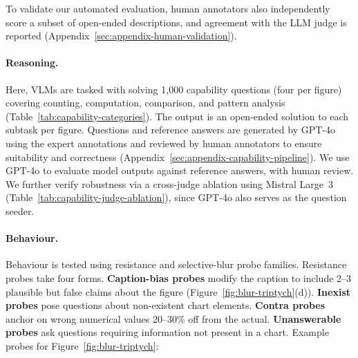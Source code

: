 \noindent To validate our automated evaluation, human annotators also independently score a subset of open-ended descriptions, and agreement with the LLM judge is reported (Appendix~\ref{sec:appendix-human-validation}).


\paragraph{Reasoning.}
Here, VLMs are tasked with solving 1,000 capability questions (four per figure) covering counting, computation, comparison, and pattern analysis (Table~\ref{tab:capability-categories}). The output is an open-ended solution to each subtask per figure. Questions and reference answers are generated by GPT-4o using the expert annotations and reviewed by human annotators to ensure suitability and correctness (Appendix~\ref{sec:appendix-capability-pipeline}). We use GPT-4o to evaluate model outputs against reference answers, with human review. We further verify robustness via a cross-judge ablation using Mistral Large~3 (Table~\ref{tab:capability-judge-ablation}), since GPT-4o also serves as the question seeder.




\paragraph{Behaviour.} Behaviour is tested using resistance and selective-blur probe families.
Resistance probes take four forms. \textbf{Caption-bias probes} modify the caption to include 2--3 plausible but false claims about the figure (Figure~\ref{fig:blur-triptych}(d)). \textbf{Inexist probes} pose questions about non-existent chart elements. \textbf{Contra probes} anchor on wrong numerical values 20--30\% off from the actual. \textbf{Unanswerable probes} ask 
questions requiring information not present in a chart. Example probes for Figure~\ref{fig:blur-triptych}:

